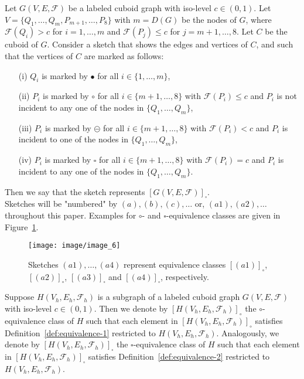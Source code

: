 \documentclass[a4paper,11pt]{article}
\begin{document}
Let $G(V,E,\mathcal{F})$ be a labeled cuboid
graph with iso-level $c\in (0,1)$. Let $V=\{Q_1,\ldots,Q_m,P_{m+1},\ldots,P_8\}$ with $m=D(G)$
be the nodes of $G$, where $\mathcal{F}(Q_i)>c$ for $i=1,\ldots,m$
and $\mathcal{F}(P_j)\leq c$ for $j=m+1,\ldots,8$. Let $C$ be the cuboid of $G$. Consider a sketch
that shows the edges and vertices of $C$, and such that the vertices of $C$ are marked as follows:
\begin{enumerate}
\item[(i)] $Q_i$ is marked by $\bullet$ for all $i\in\{1,\ldots,m\}$,
\item[(ii)] $P_i$ is marked by $\circ$ for all $i\in\{m+1,\ldots,8\}$ with $\mathcal{F}(P_i)\leq c$
and $P_i$ is not incident to any one of the nodes in $\{Q_1,\ldots,Q_m\}$,
\item[(iii)] $P_i$ is marked by $\circleddash$ for all $i\in\{m+1,\ldots,8\}$ with $\mathcal{F}(P_i)< c$
and $P_i$ is incident to one of the nodes in $\{Q_1,\ldots,Q_m\}$,
\item[(iv)]  $P_i$ is marked by $\square$ for all $i\in\{m+1,\ldots,8\}$ with $\mathcal{F}(P_i)= c$
and $P_i$ is incident to any one of the nodes in $\{Q_1,\ldots,Q_m\}$.
\end{enumerate}
Then we say that the sketch represents $[G(V,E,\mathcal{F})]_{\square}$.\\

Sketches will be "numbered" by $(a),(b),(c),\ldots$ or, $(a1),(a2),\ldots$ throughout this paper. Examples
for $\circ$- and $\square$-equivalence classes are given in Figure~\ref{image_6}.
\begin{figure}[!ht]
\texttt{[image: image/image\_6]}
\caption{Sketches $(a1),\ldots,(a4)$ represent equivalence classes $[(a1)]_{\circ}$,
$[(a2)]_{\circ}$, $[(a3)]_{\square}$ and $[(a4)]_{\square}$, respectively.}
\label{image_6}
\end{figure}
\FloatBarrier

Suppose $H(V_h,E_h,\mathcal{F}_h)$ is a subgraph of
a labeled cuboid graph $G(V,E,\mathcal{F})$ with iso-level $c\in (0,1)$. Then we denote by
$[H(V_h,E_h,\mathcal{F}_h)]_{\circ}$ the $\circ$-equivalence class of $H$ such that each element
in $[H(V_h,E_h,\mathcal{F}_h)]_{\circ}$ satisfies Definition~\ref{def:equivalence-1} restricted
to $H(V_h,E_h,\mathcal{F}_h)$. Analogously, we denote by $[H(V_h,E_h,\mathcal{F}_h)]_{\square}$ the
$\square$-equivalence class of $H$ such that each element in $[H(V_h,E_h,\mathcal{F}_h)]_{\square}$
satisfies Definition~\ref{def:equivalence-2} restricted to $H(V_h,E_h,\mathcal{F}_h)$.\\
\end{document}
